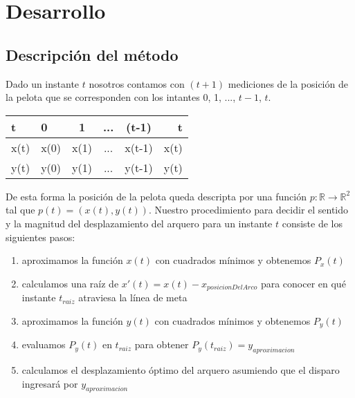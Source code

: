 \section{Desarrollo}

\subsection{Descripción del método}
Dado un instante $t$ nosotros contamos con $(t+1)$ mediciones de la posición de la pelota que se corresponden con los intantes 
0, 1, ..., $t-1$, $t$. 
\begin{center}
  \begin{tabular}{l | l*{3}{c}r}
  t              & 0 & 1 & ... & (t-1) & t\\
  \hline
  x(t)	       & x(0) & x(1) & ... & x(t-1) & x(t)\\
  \hline
  y(t)	       & y(0) & y(1) & ... & y(t-1) & y(t)\\
  \end{tabular} 
\end{center}
De esta forma la posición de la pelota queda descripta por una función $p:\mathbb{R} \to \mathbb{R}^2$ tal que $p(t) = (x(t),y(t))$.
Nuestro procedimiento para decidir el sentido y la magnitud del desplazamiento del arquero para un instante $t$ consiste de los siguientes
pasos:
\begin{enumerate}
 \item aproximamos la función $x(t)$ con cuadrados mínimos y obtenemos $P_x(t)$
 \item calculamos una raíz de $x'(t) = x(t) - x_{posicionDelArco}$ para conocer en qué instante $t_{raiz}$ atraviesa la línea de meta
 \item aproximamos la función $y(t)$ con cuadrados mínimos y obtenemos $P_y(t)$
 \item evaluamos $P_y(t)$ en $t_{raiz}$ para obtener $P_y(t_{raiz}) = y_{aproximacion}$
 \item calculamos el desplazamiento óptimo del arquero asumiendo que el disparo ingresará por $y_{aproximacion}$
\end{enumerate}

